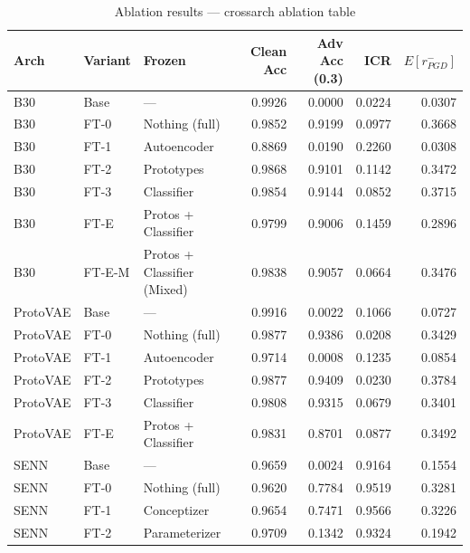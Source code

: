 \begin{table}
\caption{Ablation results — crossarch ablation table}
\label{tab:crossarch_ablation_table}
\begin{tabular}{lllrrrr}
\toprule
Arch & Variant & Frozen & Clean Acc & Adv Acc (0.3) & ICR & $E[r_{PGD}^-]$ \\
\midrule
B30 & Base & — & 0.9926 & 0.0000 & 0.0224 & 0.0307 \\
B30 & FT-0 & Nothing (full) & 0.9852 & 0.9199 & 0.0977 & 0.3668 \\
B30 & FT-1 & Autoencoder & 0.8869 & 0.0190 & 0.2260 & 0.0308 \\
B30 & FT-2 & Prototypes & 0.9868 & 0.9101 & 0.1142 & 0.3472 \\
B30 & FT-3 & Classifier & 0.9854 & 0.9144 & 0.0852 & 0.3715 \\
B30 & FT-E & Protos + Classifier & 0.9799 & 0.9006 & 0.1459 & 0.2896 \\
B30 & FT-E-M & Protos + Classifier (Mixed) & 0.9838 & 0.9057 & 0.0664 & 0.3476 \\
ProtoVAE & Base & — & 0.9916 & 0.0022 & 0.1066 & 0.0727 \\
ProtoVAE & FT-0 & Nothing (full) & 0.9877 & 0.9386 & 0.0208 & 0.3429 \\
ProtoVAE & FT-1 & Autoencoder & 0.9714 & 0.0008 & 0.1235 & 0.0854 \\
ProtoVAE & FT-2 & Prototypes & 0.9877 & 0.9409 & 0.0230 & 0.3784 \\
ProtoVAE & FT-3 & Classifier & 0.9808 & 0.9315 & 0.0679 & 0.3401 \\
ProtoVAE & FT-E & Protos + Classifier & 0.9831 & 0.8701 & 0.0877 & 0.3492 \\
SENN & Base & — & 0.9659 & 0.0024 & 0.9164 & 0.1554 \\
SENN & FT-0 & Nothing (full) & 0.9620 & 0.7784 & 0.9519 & 0.3281 \\
SENN & FT-1 & Conceptizer & 0.9654 & 0.7471 & 0.9566 & 0.3226 \\
SENN & FT-2 & Parameterizer & 0.9709 & 0.1342 & 0.9324 & 0.1942 \\
\bottomrule
\end{tabular}
\end{table}
